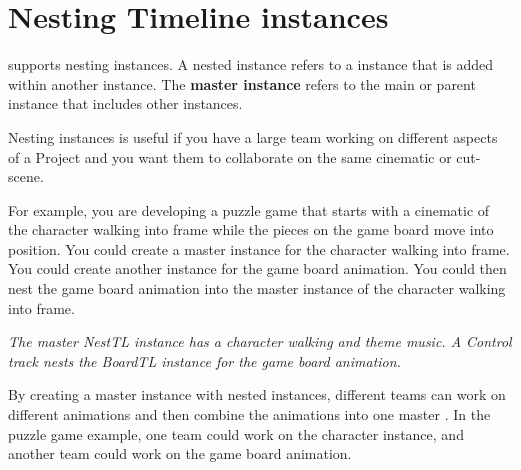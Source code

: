 \chapter{Nesting Timeline instances}
\hypertarget{md__hey_tea_9_2_library_2_package_cache_2com_8unity_8timeline_0d1_87_85_2_documentation_0i_2wf__nested}{}\label{md__hey_tea_9_2_library_2_package_cache_2com_8unity_8timeline_0d1_87_85_2_documentation_0i_2wf__nested}
\label{md__hey_tea_9_2_library_2_package_cache_2com_8unity_8timeline_0d1_87_85_2_documentation_0i_2wf__nested_autotoc_md4773}%
%
  supports nesting  instances. A nested  instance refers to a  instance that is added within another  instance. The {\bfseries{master  instance}} refers to the main or parent  instance that includes other  instances.

Nesting  instances is useful if you have a large team working on different aspects of a Project and you want them to collaborate on the same cinematic or cut-\/scene.

For example, you are developing a puzzle game that starts with a cinematic of the character walking into frame while the pieces on the game board move into position. You could create a master  instance for the character walking into frame. You could create another  instance for the game board animation. You could then nest the game board animation into the master  instance of the character walking into frame.



{\itshape The master Nest\+TL  instance has a character walking and theme music. A Control track nests the Board\+TL  instance for the game board animation.}

By creating a master  instance with nested  instances, different teams can work on different animations and then combine the animations into one master . In the puzzle game example, one team could work on the character  instance, and another team could work on the game board animation.


